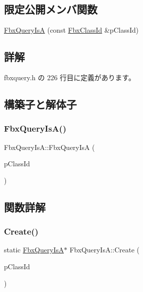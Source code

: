 \subsection*{限定公開メンバ関数}
\begin{DoxyCompactItemize}
\item 
\hyperlink{class_fbx_query_is_a_a0eff5ab3ec51aefb9c37cf8b0b06ae23}{Fbx\+Query\+IsA} (const \hyperlink{class_fbx_class_id}{Fbx\+Class\+Id} \&p\+Class\+Id)
\end{DoxyCompactItemize}


\subsection{詳解}


 fbxquery.\+h の 226 行目に定義があります。



\subsection{構築子と解体子}
\mbox{\label{class_fbx_query_is_a_a0eff5ab3ec51aefb9c37cf8b0b06ae23}} 
\subsubsection{\texorpdfstring{Fbx\+Query\+Is\+A()}{FbxQueryIsA()}}
{\footnotesize\ttfamily Fbx\+Query\+Is\+A\+::\+Fbx\+Query\+IsA (\begin{DoxyParamCaption}\item[{const \hyperlink{class_fbx_class_id}{Fbx\+Class\+Id} \&}]{p\+Class\+Id }\end{DoxyParamCaption})\hspace{0.3cm}{\ttfamily [protected]}}



\subsection{関数詳解}
\mbox{\label{class_fbx_query_is_a_a2f148f1f0d2ef5eb863d091d65a25de8}} 
\subsubsection{\texorpdfstring{Create()}{Create()}}
{\footnotesize\ttfamily static \hyperlink{class_fbx_query_is_a}{Fbx\+Query\+IsA}$\ast$ Fbx\+Query\+Is\+A\+::\+Create (\begin{DoxyParamCaption}\item[{const \hyperlink{class_fbx_class_id}{Fbx\+Class\+Id} \&}]{p\+Class\+Id }\end{DoxyParamCaption})\hspace{0.3cm}{\ttfamily [static]}}

